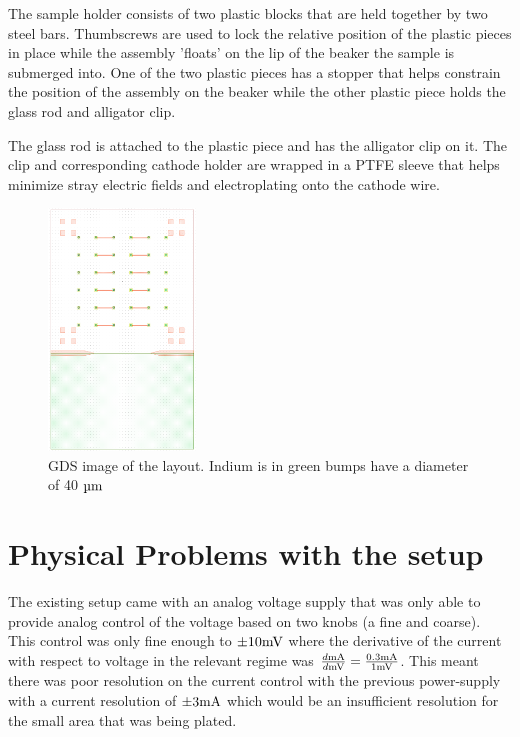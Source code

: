 The sample holder consists of two plastic blocks that are held together by two steel bars. Thumbscrews are used to lock the relative position of the plastic pieces in place while the assembly 'floats'  on the lip of the beaker the sample is submerged into. One of the two plastic pieces has a stopper that helps constrain the position of the assembly on the beaker while the other plastic piece holds the glass rod and alligator clip.

The glass rod is attached to the plastic piece and has the alligator clip on it. The clip and corresponding cathode holder are wrapped in a PTFE sleeve that helps minimize stray electric fields and electroplating onto the cathode wire.


\begin{figure}
    \centering
    \includegraphics[width=0.35\textwidth]{Main/Ch1/GDS_V1.png}
    \caption{GDS image of the layout. Indium is in green bumps have a diameter of 40 $\um$}
    \label{fig:gds_ch1}
\end{figure}


\section{Physical Problems with the setup}

The existing setup came with an analog voltage supply that was only able to provide analog control of the voltage based on two knobs (a fine and coarse). This control was only fine enough to $\pm 10 \mV$ where the derivative of the current with respect to voltage in the relevant regime was $\frac{d \mA}{d \mV} = \frac{0.3 \mA}{1 \mV}$.
This meant there was poor resolution on the current control with the previous power-supply with a current resolution of $\pm 3 \mA$ which would be an insufficient resolution for the small area that was being plated.

